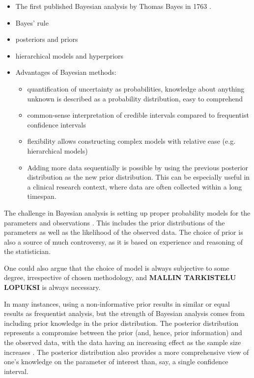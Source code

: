 \begin{itemize}
  \item The first published Bayesian analysis by Thomas Bayes in 1763 \citep{Gelman2013}.
  \item Bayes' rule
  \item posteriors and priors
  \item hierarchical models and hyperpriors
  \item Advantages of Bayesian methods:
  \begin{itemize}
    \item
    quantification of uncertainty as probabilities, knowledge about anything
    unknown is described as a probability distribution, easy to comprehend
    \item
    common-sense interpretation of credible intervals compared to frequentist
    confidence intervals
    \item
    flexibility allows constructing complex models with relative ease (e.g.
    hierarchical models)
    \item
    Adding more data sequentially is possible by using the previous posterior
    distribution as the new prior distribution. This can be especially useful in
    a clinical research context, where data are often collected within a long
    timespan.
  \end{itemize}
\end{itemize}
The challenge in Bayesian analysis is setting up proper probability models for
the parameters and observations \citep{Gelman2013}. This includes the prior
distributions of the parameters as well as the likelihood of the observed data.
The choice of prior is also a source of much controversy, as it is based
on experience and reasoning of the statistician.

One could also argue that the choice of model is always subjective to some
degree, irrespective of chosen methodology, and \textbf{MALLIN TARKISTELU
LOPUKSI} is always necessary.

In many instances, using a non-informative prior results in similar or equal
results as frequentist analysis, but the strength of Bayesian analysis comes
from including prior knowledge in the prior distribution. \citep{Jaynes?} The
posterior distribution represents a compromise between the prior (and, hence,
prior information) and the observed data, with the data having an increasing
effect as the sample size increases \citep{Gelman2013}. The posterior
distribution also provides a more comprehensive view of
one's knowledge on the parameter of interest than, say, a single confidence
interval.

